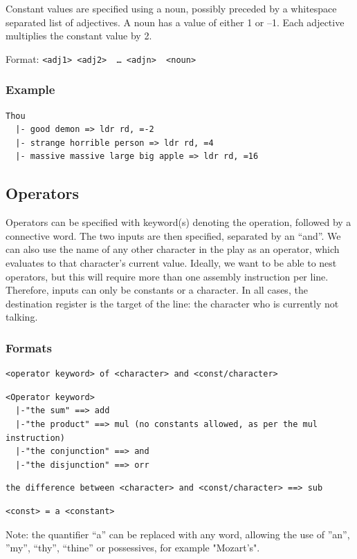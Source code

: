 \documentclass[11pt]{article}
\begin{document}
Constant values are specified using a noun, possibly preceded by a whitespace separated list of adjectives. A noun has a value of either 1 or –1. Each adjective multiplies the constant value by 2.

Format:
\verb|<adj1> <adj2>  … <adjn>  <noun>|

\subsubsection{Example}
\begin{verbatim}
Thou
  |- good demon => ldr rd, =-2
  |- strange horrible person => ldr rd, =4
  |- massive massive large big apple => ldr rd, =16
\end{verbatim}

\subsection{Operators}

Operators can be specified with keyword(s) denoting the operation, followed by a connective word. The two inputs are then specified, separated by an “and”. We can also use the name of any other character in the play as an operator, which evaluates to that character’s current value. Ideally, we want to be able to nest operators, but this will require more than one assembly instruction per line. Therefore, inputs can only be constants or a character. In all cases, the destination register is the target of the line: the character who is currently not talking.

\subsubsection{Formats}
\begin{verbatim}
<operator keyword> of <character> and <const/character>
\end{verbatim}
\begin{verbatim}
<Operator keyword>
  |-"the sum" ==> add
  |-"the product" ==> mul (no constants allowed, as per the mul instruction)
  |-"the conjunction" ==> and
  |-"the disjunction" ==> orr
\end{verbatim}
\begin{verbatim}
the difference between <character> and <const/character> ==> sub
\end{verbatim}
\begin{verbatim}
<const> = a <constant>
\end{verbatim}
Note: the quantifier “a” can be replaced with any word, allowing the use of ”an”, ”my”, “thy”, “thine” or possessives, for example "Mozart's".
\end{document}
